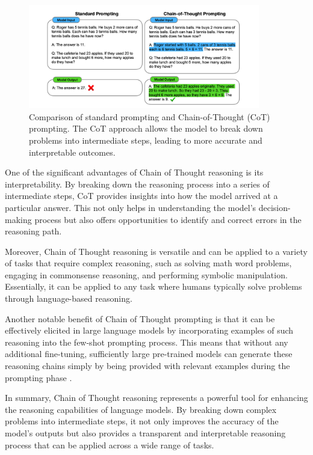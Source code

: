 \begin{figure}[h]
    \centering
    \includegraphics[width=0.9\textwidth]{images/llms/cot-resoning.png}
    \caption{Comparison of standard prompting and Chain-of-Thought (CoT) prompting. The CoT approach allows the model to break down problems into intermediate steps, leading to more accurate and interpretable outcomes.}
    \label{fig:cot_reasoning}
\end{figure}

One of the significant advantages of Chain of Thought reasoning is its interpretability. By breaking down the reasoning process into a series of intermediate steps, CoT provides insights into how the model arrived at a particular answer. This not only helps in understanding the model’s decision-making process but also offers opportunities to identify and correct errors in the reasoning path.

Moreover, Chain of Thought reasoning is versatile and can be applied to a variety of tasks that require complex reasoning, such as solving math word problems, engaging in commonsense reasoning, and performing symbolic manipulation. Essentially, it can be applied to any task where humans typically solve problems through language-based reasoning.

Another notable benefit of Chain of Thought prompting is that it can be effectively elicited in large language models by incorporating examples of such reasoning into the few-shot prompting process. This means that without any additional fine-tuning, sufficiently large pre-trained models can generate these reasoning chains simply by being provided with relevant examples during the prompting phase \cite{wei2022chain}.

In summary, Chain of Thought reasoning represents a powerful tool for enhancing the reasoning capabilities of language models. By breaking down complex problems into intermediate steps, it not only improves the accuracy of the model’s outputs but also provides a transparent and interpretable reasoning process that can be applied across a wide range of tasks.

